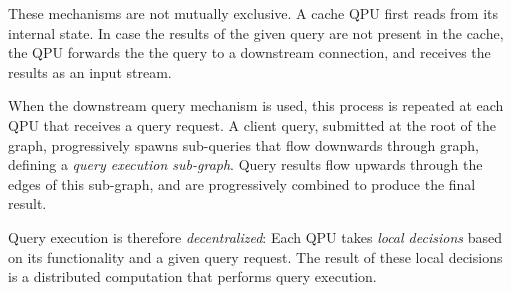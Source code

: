 These mechanisms are not mutually exclusive.
A cache QPU first reads from its internal state.
In case the results of the given query are not present in the cache,
the QPU forwards the the query to a downstream connection, and receives the results as an input stream.

When the downstream query mechanism is used,
this process is repeated at each QPU that receives a query request.
A client query, submitted at the root of the graph, progressively spawns sub-queries that flow downwards through
graph, defining a \textit{query execution sub-graph}.
Query results flow upwards through the edges of this sub-graph,
and are progressively combined to produce the final result.

Query execution is therefore \textit{decentralized}:
Each QPU takes \textit{local decisions} based on its functionality and a given query request.
The result of these local decisions is a distributed computation that performs query execution.










